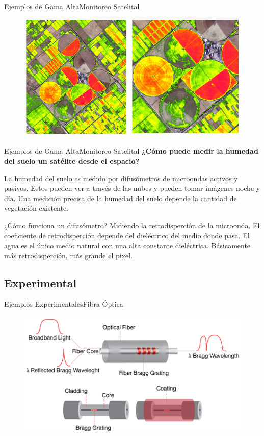 \documentclass[]{beamer}
\begin{document}
\begin{frame}{Ejemplos de Gama Alta}{Monitoreo Satelital}
  \begin{figure}
    \includegraphics[height=0.7\textheight]{Docs/ms1}
    \caption{}
    \label{}
  \end{figure}
\end{frame}

\begin{frame}{Ejemplos de Gama Alta}{Monitoreo Satelital}
\textbf{¿Cómo puede medir la humedad del suelo un satélite desde el espacio?}

La humedad del suelo es medido por difusómetros de microondas activos y pasivos. Estos pueden ver a través de las nubes y pueden tomar imágenes noche y día. Una medición precisa de la humedad del suelo depende la cantidad de vegetación existente. 

¿Cómo funciona un difusómetro?
Midiendo la retrodisperción de la microonda. El coeficiente de retrodisperción depende del dieléctrico del medio donde pasa. El agua es el único medio natural con una alta constante dieléctrica. Básicamente más retrodisperción, más grande el pixel. 



\end{frame}

\subsection{Experimental}
\begin{frame}{Ejemplos Experimentales}{Fibra Óptica}
  \begin{figure}
    \includegraphics[height=0.7\textheight]{Docs/exp1}
    \caption{}
    \label{}
  \end{figure}

\end{frame}
\end{document}
